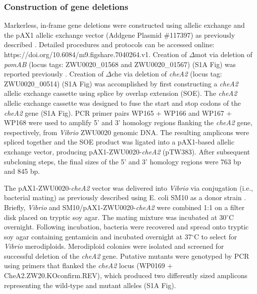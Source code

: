 \subsubsection{Construction of gene deletions}
Markerless, in-frame gene deletions were constructed using allelic exchange and the pAX1 allelic exchange vector (Addgene Plasmid \#117397) as previously described \cite{wiles_modernized_2018}. Detailed procedures and protocols can be accessed online: https://doi.org/10.6084/m9.figshare.7040264.v1. Creation of $\Delta$mot via deletion of \textit{\textit{pomAB}} (locus tags: ZWU0020\_01568 and ZWU0020\_01567) (S1A Fig) was reported previously \cite{wiles_modernized_2018}. Creation of $\Delta$che via deletion of \textit{cheA2} (locus tag: ZWU0020\_00514) (S1A Fig) was accomplished by first constructing a \textit{cheA2} allelic exchange cassette using splice by overlap extension (SOE). The \textit{cheA2} allelic exchange cassette was designed to fuse the start and stop codons of the \textit{cheA2} gene (S1A Fig). PCR primer pairs WP165 + WP166 and WP167 + WP168 were used to amplify 5' and 3' homology regions flanking the \textit{cheA2} gene, respectively, from \textit{Vibrio} ZWU0020 genomic DNA. The resulting amplicons were spliced together and the SOE product was ligated into a pAX1-based allelic exchange vector, producing pAX1-ZWU0020-\textit{cheA2} (pTW383). After subsequent subcloning steps, the final sizes of the 5' and 3' homology regions were 763 bp and 845 bp.   

The pAX1-ZWU0020-\textit{cheA2} vector was delivered into \textit{Vibrio} via conjugation (i.e., bacterial mating) as previously described using E. coli SM10 as a donor strain \cite{wiles_modernized_2018}. Briefly, \textit{Vibrio} and SM10/pAX1-ZWU0020-\textit{cheA2} were combined 1:1 on a filter disk placed on tryptic soy agar. The mating mixture was incubated at 30$^\circ$C overnight. Following incubation, bacteria were recovered and spread onto tryptic soy agar containing gentamicin and incubated overnight at 37$^\circ$C to select for \textit{Vibrio} merodiploids. Merodiploid colonies were isolated and screened for successful deletion of the \textit{cheA2} gene. Putative mutants were genotyped by PCR using primers that flanked the \textit{cheA2} locus (WP0169 + CheA2.ZW20.KOconfirm.REV), which produced two differently sized amplicons representing the wild-type and mutant alleles (S1A Fig). 

